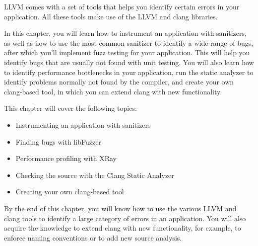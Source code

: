 LLVM comes with a set of tools that helps you identify certain errors in your application. All these tools make use of the LLVM and clang libraries.

In this chapter, you will learn how to instrument an application with sanitizers, as well as how to use the most common sanitizer to identify a wide range of bugs, after which you’ll implement fuzz testing for your application. This will help you identify bugs that are usually not found with unit testing. You will also learn how to identify performance bottlenecks in your application, run the static analyzer to identify problems normally not found by the compiler, and create your own clang-based tool, in which you can extend clang with new functionality.

This chapter will cover the following topics:

\begin{itemize}
\item
Instrumenting an application with sanitizers

\item
Finding bugs with libFuzzer

\item
Performance profiling with XRay

\item
Checking the source with the Clang Static Analyzer

\item
Creating your own clang-based tool
\end{itemize}

By the end of this chapter, you will know how to use the various LLVM and clang tools to identify a large category of errors in an application. You will also acquire the knowledge to extend clang with new functionality, for example, to enforce naming conventions or to add new source analysis.

